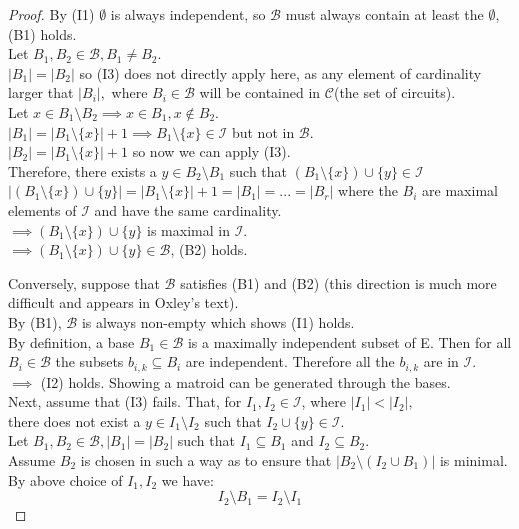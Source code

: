\documentclass[../main.tex]{subfiles}
\begin{document}
\begin{proof}
\noindent By (I1) $\emptyset$ is always independent, so $\mathcal{B}$ must always contain at least the $\emptyset$, (B1) holds.\\
\noindent Let $B_1 ,B_2 \in \mathcal{B}, B_1 \neq B_2.$ \\
\noindent $|B_1| = |B_2|$ so (I3) does not directly apply here, as any element of cardinality larger that $|B_i|,$ where $B_i \in \mathcal{B}$ will be contained in $\mathcal{C}$(the set of circuits).\\
\noindent Let $x \in B_1 \setminus B_2 \implies x \in B_1, x \notin B_2.$\\
\noindent $|B_1| = |B_1 \setminus \{x\}| + 1 \implies B_1 \setminus \{x\} \in \mathcal{I}$ but not in $\mathcal{B}.$\\
\noindent $|B_2| = |B_1 \setminus \{x\}| + 1$ so now we can apply (I3).\\
\noindent Therefore, there exists a $y \in B_2 \setminus B_1$ such that $(B_1 \setminus \{x\}) \cup \{y\} \in \mathcal{I}$\\
$|(B_1 \setminus \{x\}) \cup \{y\}| = |B_1 \setminus \{x\}| + 1 = |B_1| = ... = |B_r|$ where the $B_i$ are maximal elements of $\mathcal{I}$ and have the same cardinality.\\ $\implies (B_1 \setminus \{x\}) \cup \{y\}$ is maximal in $\mathcal{I}.$\\
$\implies (B_1 \setminus \{x\}) \cup \{y\} \in \mathcal{B}$, (B2) holds.

\vspace{4mm}

\noindent Conversely, suppose that $\mathcal{B}$ satisfies (B1) and (B2) (this direction is much more difficult and appears in Oxley's text\cite{ox_book}).\\
\noindent By (B1), $\mathcal{B}$ is always non-empty which shows (I1) holds.
\\
\noindent By definition, a base $B_1 \in \mathcal{B}$ is a maximally independent subset of E. Then for all $B_i \in \mathcal{B}$ the subsets $b_{i,k} \subseteq B_i$  are independent. Therefore all the $b_{i,k}$ are in $\mathcal{I}.$\\ \noindent $\implies$ (I2) holds. Showing a matroid can be generated through the bases.
\\
\noindent Next, assume that (I3) fails. That, for $I_1, I_2 \in \mathcal{I}$, where $|I_1|<|I_2|,$\\ \noindent there does not exist a  $y \in I_1 \setminus I_2$ such that $I_2 \cup \{y\} \in \mathcal{I}.$\\
\noindent Let $B_1, B_2 \in \mathcal{B}, |B_1| = |B_2|$ such that $I_1 \subseteq B_1$ and $I_2 \subseteq B_2.$\\
Assume $B_2$ is chosen in such a way as to ensure that $|B_2 \setminus (I_2 \cup B_1)|$ is minimal. By above choice of $I_1,I_2$ we have:\\
\begin{equation}
I_2 \setminus B_1 = I_2 \setminus I_1
\end{equation}


\end{proof}
\end{document}
